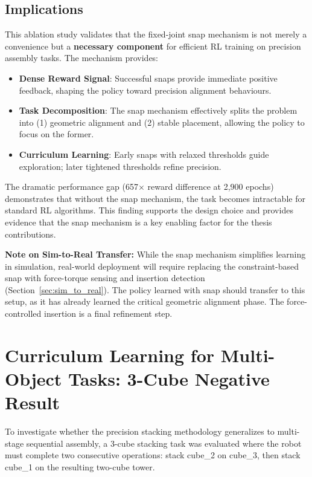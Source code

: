 \documentclass[12pt,a4paper,oneside]{report}
\begin{document}
\subsection{Implications}

This ablation study validates that the fixed-joint snap mechanism is not merely a convenience but a \textbf{necessary component} for efficient RL training on precision assembly tasks. The mechanism provides:

\begin{itemize}
    \item \textbf{Dense Reward Signal}: Successful snaps provide immediate positive feedback, shaping the policy toward precision alignment behaviours.
    \item \textbf{Task Decomposition}: The snap mechanism effectively splits the problem into (1) geometric alignment and (2) stable placement, allowing the policy to focus on the former.
    \item \textbf{Curriculum Learning}: Early snaps with relaxed thresholds guide exploration; later tightened thresholds refine precision.
\end{itemize}

The dramatic performance gap (657$\times$ reward difference at 2{,}900 epochs) demonstrates that without the snap mechanism, the task becomes intractable for standard RL algorithms. This finding supports the design choice and provides evidence that the snap mechanism is a key enabling factor for the thesis contributions.

\textbf{Note on Sim-to-Real Transfer:} While the snap mechanism simplifies learning in simulation, real-world deployment will require replacing the constraint-based snap with force-torque sensing and insertion detection (Section~\ref{sec:sim_to_real}). The policy learned with snap should transfer to this setup, as it has already learned the critical geometric alignment phase. The force-controlled insertion is a final refinement step.

\section{Curriculum Learning for Multi-Object Tasks: 3-Cube Negative Result}

To investigate whether the precision stacking methodology generalizes to multi-stage sequential assembly, a 3-cube stacking task was evaluated where the robot must complete two consecutive operations: stack cube\_2 on cube\_3, then stack cube\_1 on the resulting two-cube tower.
\end{document}
